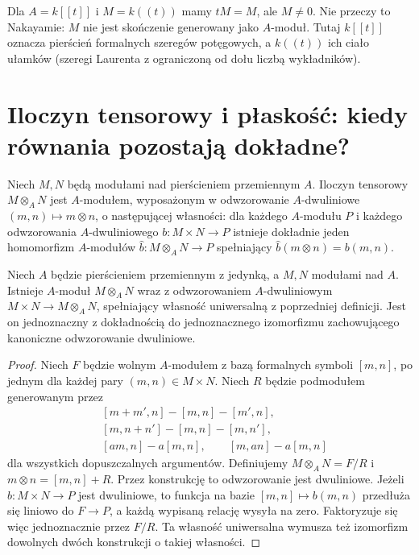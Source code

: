 \begin{uwaga}
Dla $A=k[[t]]$ i $M=k((t))$ mamy $tM=M$,
ale $M\ne0$. Nie przeczy to Nakayamie: $M$
nie jest skończenie generowany jako $A$-moduł.
Tutaj $k[[t]]$ oznacza pierścień formalnych
szeregów potęgowych, a $k((t))$ ich ciało ułamków
(szeregi Laurenta z ograniczoną od dołu liczbą wykładników).
\end{uwaga}

\section{Iloczyn tensorowy i płaskość: kiedy równania pozostają dokładne?}
\label{sec:flatness}

\begin{definicja}
Niech $M,N$ będą modułami nad pierścieniem przemiennym $A$.
Iloczyn tensorowy $M\otimes_A N$ jest $A$-modułem,
wyposażonym w odwzorowanie $A$-dwuliniowe
$(m,n)\mapsto m\otimes n$, o następującej własności:
dla każdego $A$-modułu $P$ i każdego odwzorowania
$A$-dwuliniowego $b:M\times N\to P$ istnieje dokładnie
jeden homomorfizm $A$-modułów
$\widehat b:M\otimes_A N\to P$ spełniający
$\widehat b(m\otimes n)=b(m,n)$.
\end{definicja}

\begin{stwierdzenie}
Niech $A$ będzie pierścieniem przemiennym z jedynką, a $M,N$
modułami nad $A$. Istnieje $A$-moduł $M\otimes_A N$
wraz z odwzorowaniem $A$-dwuliniowym
$M\times N\to M\otimes_A N$, spełniający własność
uniwersalną z poprzedniej definicji. Jest on jednoznaczny
z dokładnością do jednoznacznego izomorfizmu zachowującego
kanoniczne odwzorowanie dwuliniowe.
\end{stwierdzenie}
\begin{proof}
Niech $F$ będzie wolnym $A$-modułem z bazą
formalnych symboli $[m,n]$, po jednym dla każdej
pary $(m,n)\in M\times N$. Niech $R$ będzie
podmodułem generowanym przez
\[
\begin{aligned}
 &[m+m',n]-[m,n]-[m',n],\\
 &[m,n+n']-[m,n]-[m,n'],\\
 &[am,n]-a[m,n],\qquad [m,an]-a[m,n]
\end{aligned}
\]
dla wszystkich dopuszczalnych argumentów.
Definiujemy $M\otimes_A N=F/R$ i
$m\otimes n=[m,n]+R$. Przez konstrukcję
to odwzorowanie jest dwuliniowe.
Jeżeli $b:M\times N\to P$ jest dwuliniowe,
to funkcja na bazie $[m,n]\mapsto b(m,n)$
przedłuża się liniowo do $F\to P$, a każdą
wypisaną relację wysyła na zero.
Faktoryzuje się więc jednoznacznie przez $F/R$.
Ta własność uniwersalna wymusza też izomorfizm
dowolnych dwóch konstrukcji o takiej własności.
\end{proof}


